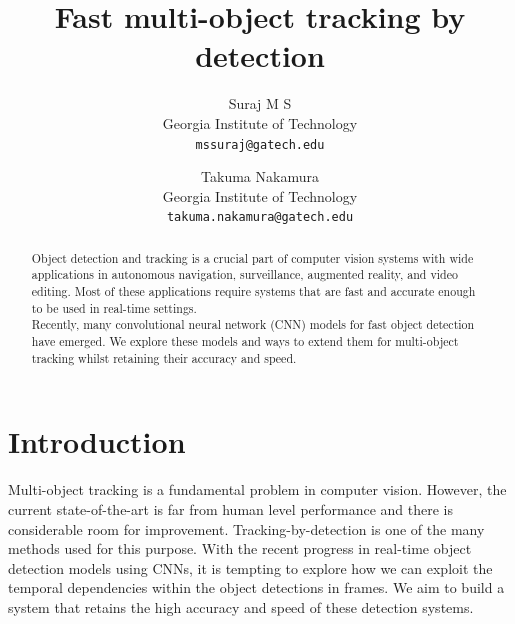 \documentclass[10pt,twocolumn,letterpaper]{article}
\begin{document}
\title{Fast multi-object tracking by detection}

\author{Suraj M S\\
Georgia Institute of Technology\\
{\tt\small mssuraj@gatech.edu}
\and
Takuma Nakamura\\
Georgia Institute of Technology\\
{\tt\small takuma.nakamura@gatech.edu}
}

\maketitle

\begin{abstract}
   Object detection and tracking is a crucial part of computer vision systems with wide applications in autonomous navigation, surveillance, augmented reality, and video editing. Most of these applications require systems that are fast and accurate enough to be used in real-time settings.\\
	Recently, many convolutional neural network (CNN) models for fast object detection have emerged. We explore these models and ways to extend them for multi-object tracking whilst retaining their accuracy and speed.
\end{abstract}

\section{Introduction}

Multi-object tracking is a fundamental problem in computer vision. However, the current state-of-the-art is far from human level performance and there is considerable room for improvement. Tracking-by-detection is one of the many methods used for this purpose. With the recent progress in real-time object detection models using CNNs, it is tempting to explore how we can exploit the temporal dependencies within the object detections in frames. We aim to build a system that retains the high accuracy and speed of these detection systems.\\

\end{document}
